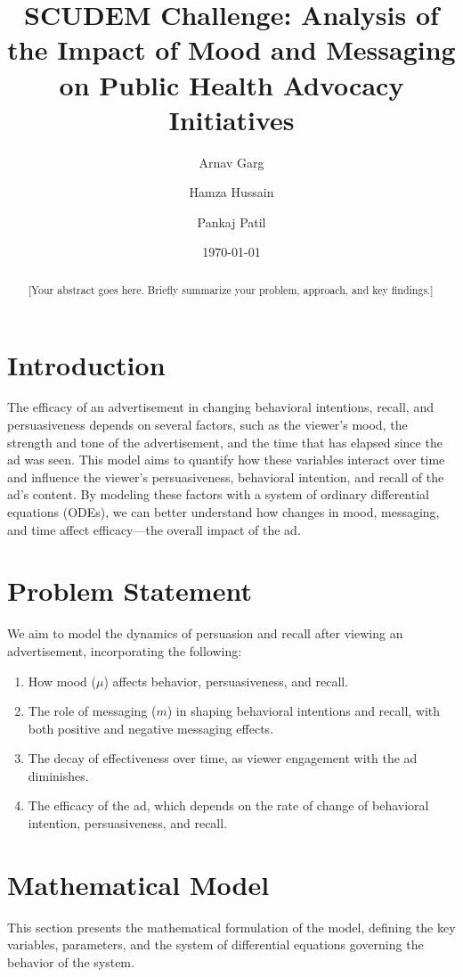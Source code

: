 \documentclass[12pt,a4paper]{article}
\title{\Large\textbf{SCUDEM Challenge: Analysis of the Impact of Mood and Messaging on Public Health Advocacy Initiatives}}
\author{
    Arnav Garg \and Hamza Hussain \and Pankaj Patil \\
}
\date{\today}
\begin{document}
\maketitle

\begin{abstract}
    [Your abstract goes here. Briefly summarize your problem, approach, and key findings.]
\end{abstract}

\section{Introduction}
The efficacy of an advertisement in changing behavioral intentions, recall, and persuasiveness depends on several factors, such as the viewer’s mood, the strength and tone of the advertisement, and the time that has elapsed since the ad was seen. This model aims to quantify how these variables interact over time and influence the viewer’s persuasiveness, behavioral intention, and recall of the ad’s content. By modeling these factors with a system of ordinary differential equations (ODEs), we can better understand how changes in mood, messaging, and time affect efficacy—the overall impact of the ad.

\section{Problem Statement}
We aim to model the dynamics of persuasion and recall after viewing an advertisement, incorporating the following:
\begin{enumerate}
    \item How mood (\( \mu \)) affects behavior, persuasiveness, and recall.
    \item The role of messaging (\( m \)) in shaping behavioral intentions and recall, with both positive and negative messaging effects.
    \item The decay of effectiveness over time, as viewer engagement with the ad diminishes.
    \item The efficacy of the ad, which depends on the rate of change of behavioral intention, persuasiveness, and recall.
\end{enumerate}

\section{Mathematical Model}
This section presents the mathematical formulation of the model, defining the key variables, parameters, and the system of differential equations governing the behavior of the system.
\end{document}
